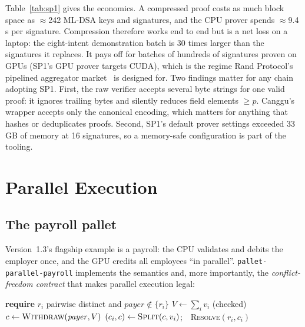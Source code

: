 \documentclass[11pt]{article}
\theoremstyle{definition}
\theoremstyle{remark}
\begin{document}
Table~\ref{tab:sp1} gives the economics. A compressed proof costs as much block space as
$\approx$242 ML-DSA keys and signatures, and the CPU prover spends $\approx$9.4\,s per signature.
Compression therefore works end to end but is a net loss on a laptop: the eight-intent demonstration
batch is 30 times larger than the signatures it replaces. It pays off for batches of hundreds of
signatures proven on GPUs (SP1's GPU prover targets CUDA), which is the regime Rand Protocol's
pipelined aggregator market~\cite{rand} is designed for. Two findings matter for any chain adopting
SP1. First, the raw verifier accepts several byte strings for one valid proof: it ignores trailing
bytes and silently reduces field elements $\geq p$. Canggu's wrapper accepts only the canonical
encoding, which matters for anything that hashes or deduplicates proofs. Second, SP1's default
prover settings exceeded 33\,GB of memory at 16 signatures, so a memory-safe configuration
is part of the tooling.

\section{Parallel Execution}
\label{sec:parallel}

\subsection{The payroll pallet}

Version~1.3's flagship example is a payroll: the CPU validates and debits the employer once, and
the GPU credits all employees ``in parallel''. \texttt{pallet-parallel-payroll} implements the
semantics and, more importantly, the \emph{conflict-freedom contract} that makes parallel execution
legal:

\begin{algorithm}[ht]
\caption{\texttt{batch\_pay}$(\mathit{payer}, [(r_1, v_1), \dots, (r_N, v_N)])$}
\begin{algorithmic}[1]
\State \textbf{require} $r_i$ pairwise distinct and $\mathit{payer} \notin \{r_i\}$ 
\State $V \gets \sum_i v_i$ (checked) 
\State $c \gets \textsc{Withdraw}(\mathit{payer}, V)$ 
 
  \State $(c_i, c) \gets \textsc{Split}(c, v_i)$;\ \ \textsc{Resolve}$(r_i, c_i)$
\EndFor
\end{algorithmic}
\end{algorithm}
\end{document}
